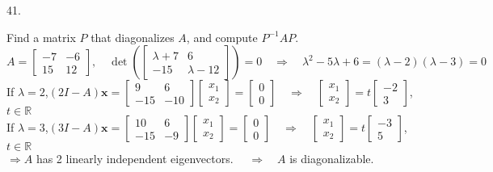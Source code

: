 \documentclass[12pt]{book}
\begin{document}
\begin{CJK}{UTF8}{bsmi}
41. \begin{minipage}[t]{\dimexpr\linewidth}
Find a matrix $P$ that diagonalizes $A$, and compute $P^{-1}AP$. \\
$A=\begin{bmatrix}
-7 & -6 \\
15 & 12
\end{bmatrix},\quad \det(\begin{bmatrix}
\lambda+7 & 6 \\
-15 & \lambda-12
\end{bmatrix})=0\quad\Rightarrow\quad\lambda^2-5\lambda+6=(\lambda-2)(\lambda-3)=0$ \\
If $\lambda=2$,\quad $(2I-A)\textbf{x}=\begin{bmatrix}
9 & 6 \\
-15 & -10
\end{bmatrix}\begin{bmatrix}
x_1 \\ x_2
\end{bmatrix}=\begin{bmatrix}
0 \\ 0
\end{bmatrix}\quad\Rightarrow\quad\begin{bmatrix}
x_1 \\ x_2
\end{bmatrix}=t\begin{bmatrix}
-2 \\ 3
\end{bmatrix}$,\quad $t\in\mathbb{R}$ \\
If $\lambda=3$,\quad $(3I-A)\textbf{x}=\begin{bmatrix}
10 & 6 \\
-15 & -9
\end{bmatrix}\begin{bmatrix}
x_1 \\ x_2
\end{bmatrix}=\begin{bmatrix}
0 \\ 0
\end{bmatrix}\quad\Rightarrow\quad\begin{bmatrix}
x_1 \\ x_2
\end{bmatrix}=t\begin{bmatrix}
-3 \\ 5
\end{bmatrix}$,\quad $t\in\mathbb{R}$ \\
$\Rightarrow A$ has 2 linearly independent eigenvectors. $\quad\Rightarrow\quad A$ is diagonalizable. \\

\end{minipage}
\end{CJK}
\end{document}
